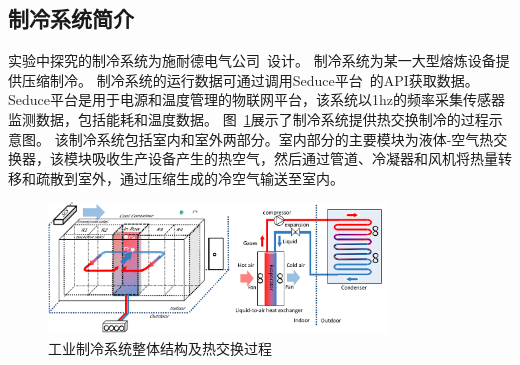 \subsection{制冷系统简介}
\label{sec:ecotype_description}

实验中探究的制冷系统为施耐德电气公司~\cite{InrowACRD602}设计。
制冷系统为某一大型熔炼设备提供压缩制冷。
制冷系统的运行数据可通过调用Seduce平台~\cite{SeducePastor2018}的API获取数据。
Seduce平台是用于电源和温度管理的物联网平台，该系统以1hz的频率采集传感器监测数据，包括能耗和温度数据。
图~\ref{fig:inrow_3dArchitecture}展示了制冷系统提供热交换制冷的过程示意图。
该制冷系统包括室内和室外两部分。室内部分的主要模块为液体-空气热交换器，该模块吸收生产设备产生的热空气，然后通过管道、冷凝器和风机将热量转移和疏散到室外，通过压缩生成的冷空气输送至室内。

\begin{figure}[!htbp]
  \centering
  \includegraphics[width=0.8\textwidth]{figures/chapter4/inrow_architecture.png}
  \caption{工业制冷系统整体结构及热交换过程}
\label{fig:inrow_3dArchitecture} 
\end{figure}

